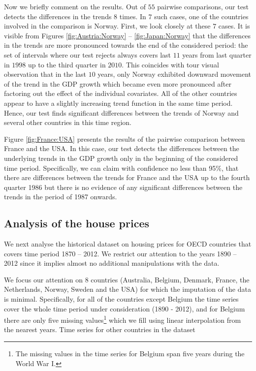 \documentclass[a4paper,12pt]{article}
\begin{document}
Now we briefly comment on the results. Out of $55$ pairwise comparisons, our test detects the differences in the trends $8$ times. In $7$ such cases, one of the countries involved in the comparison is Norway. First, we look closely at these $7$ cases. It is visible from Figures \ref{fig:Austria:Norway} -- \ref{fig:Japan:Norway} that the differences in the trends are more pronounced towards the end of the considered period: the set of intervals where our test rejects always covers last $11$ years from last quarter in $1998$ up to the third quarter in $2010$. This coincides with tour visual observation that in the last $10$ years, only Norway exhibited downward movement of the trend in the GDP growth which became even more pronounced after factoring out the effect of the individual covariates. All of the other countries appear to have a slightly increasing trend function in the same time period. Hence, our test finds significant differences between the trends of Norway and several other countries in this time region.

Figure \ref{fig:France:USA} presents the results of the pairwise comparison between France and the USA. In this case, our test detects the differences between the underlying trends in the GDP growth only in the beginning of the considered time period. Specifically, we can claim with confidence no less than 95\%, that there are differences between the trends for France and the USA up to the fourth quarter 1986 but there is no evidence of any significant differences between the trends in the period of 1987 onwards.

\subsection{Analysis of the house prices}\label{subsec:app:house}
We next analyse the historical dataset on housing prices for OECD countries that covers time period 1870 -- 2012. We restrict our attention to the years 1890 -- 2012 since it implies almost no additional manipulations with the data.

We focus our attention on 8 countries (Australia, Belgium, Denmark, France, the Netherlands, Norway, Sweden and the USA) for which the imputation of the data is minimal. Specifically, for all of the countries except Belgium the time series cover the whole time period under consideration (1890 - 2012), and for Belgium there are only five missing values\footnote{The missing values in the time series for Belgium span five years during the World War I.} which we fill using linear interpolation from the nearest years. Time series for other countries in the dataset \cite{Knoll2017}
\end{document}
